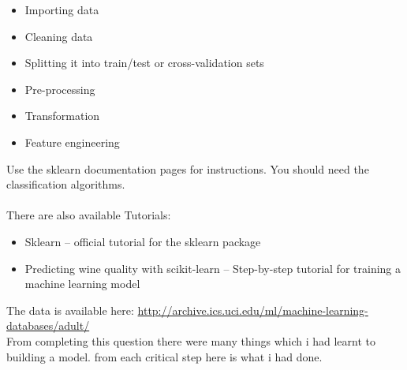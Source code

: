 \documentclass{article}
\newcommand*\fixindent{ \hspace{1pt}\\}
\begin{document}
\begin{itemize}
    \item {Importing data}
    \item {Cleaning data}
    \item {Splitting it into train/test or cross-validation sets}
    \item {Pre-processing}
    \item {Transformation}
    \item {Feature engineering}
\end{itemize}
Use the sklearn documentation pages for instructions. You should need the classification algorithms.\\\\
There are also available Tutorials:
\begin{itemize}
    \item Sklearn – official tutorial for the sklearn package 
    \item Predicting wine quality with scikit-learn – Step-by-step tutorial for training a machine learning model
\end{itemize}
The data is available here: \href{http://archive.ics.uci.edu/ml/machine-learning-databases/adult/}{http://archive.ics.uci.edu/ml/machine-learning-databases/adult/}
\newpage
\fixindent{}From completing this question there were many things which i had learnt to building a model. from each critical step here is what i had done.\\
\end{document}
